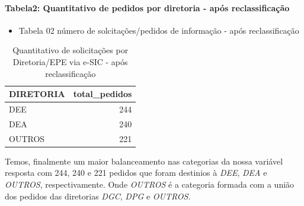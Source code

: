 \documentclass[]{article}
\newenvironment{Shaded}{\begin{snugshade}}{\end{snugshade}}
\newcommand{\KeywordTok}[1]{\textcolor[rgb]{0.13,0.29,0.53}{\textbf{#1}}}
\newcommand{\DataTypeTok}[1]{\textcolor[rgb]{0.13,0.29,0.53}{#1}}
\newcommand{\StringTok}[1]{\textcolor[rgb]{0.31,0.60,0.02}{#1}}
\newcommand{\OtherTok}[1]{\textcolor[rgb]{0.56,0.35,0.01}{#1}}
\newcommand{\OperatorTok}[1]{\textcolor[rgb]{0.81,0.36,0.00}{\textbf{#1}}}
\newcommand{\NormalTok}[1]{#1}
\providecommand{\tightlist}{%
  \setlength{\itemsep}{0pt}\setlength{\parskip}{0pt}}
\let\oldparagraph\paragraph
\renewcommand{\paragraph}[1]{\oldparagraph{#1}\mbox{}}
\begin{document}
\paragraph{Tabela2: Quantitativo de pedidos por diretoria - após
reclassificação}\label{tabela2-quantitativo-de-pedidos-por-diretoria---apos-reclassificacao}

\begin{itemize}
\tightlist
\item
  Tabela 02 número de solcitações/pedidos de informação - após
  reclassificação
\end{itemize}

\begin{Shaded}
\end{Shaded}

\begin{table}[!h]

\caption{\label{tab:unnamed-chunk-21}Quantitativo de solicitações por Diretoria/EPE via e-SIC - após reclassificação}
\centering
\begin{tabular}{lr}
\toprule
DIRETORIA & total\_pedidos\\
\midrule
\rowcolor{gray!6}  DEE & 244\\
DEA & 240\\
\rowcolor{gray!6}  OUTROS & 221\\
\bottomrule
\end{tabular}
\end{table}

Temos, finalmente um maior balanceamento nas categorias da nossa
variável resposta com 244, 240 e 221 pedidos que foram destinios à
\emph{DEE}, \emph{DEA} e \emph{OUTROS}, respectivamente. Onde
\emph{OUTROS} é a categoria formada com a união dos pedidos das
diretorias \emph{DGC}, \emph{DPG} e \emph{OUTROS}.
\end{document}
